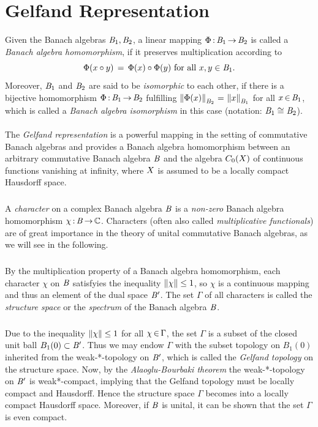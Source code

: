 \documentclass[11pt,twoside]{article}
\begin{document}
\section{Gelfand Representation}
Given the Banach algebras $\mathit{B}_1, \mathit{B}_2$,
a linear mapping $\Phi{\,:\,}\mathit{B}_1 {\,\to\,} \mathit{B}_2$
is called a \textit{Banach algebra homomorphism},
if it preserves multiplication according to 
\[
\Phi(x \circ y) \,=\, \Phi(x) \circ \Phi(y)
\mbox{ for all } x,y \in \mathit{B}_1.
\]
Moreover,
$\mathit{B}_1$ and $\mathit{B}_2$ are said
to be \textit{isomorphic} to each other, 
if there is a bijective homomorphism $\Phi {\,:\,}\mathit{B}_1 {\,\to\,} \mathit{B}_2$ fulfilling
$\left\lVert \Phi(x) \right\rVert_{\mathit{B}_2} {\,=\,} \left\lVert x \right\rVert_{\mathit{B}_1}$ for all $x {\,\in\,} \mathit{B}_1$,
which is called a \textit{Banach algebra isomorphism} in this case
(notation: $\mathit{B}_1 \cong \mathit{B}_2$).

\paragraph{} %
The \textit{Gelfand representation} is a powerful mapping
in the setting of commutative Banach algebras
and provides a Banach algebra homomorphism
between an arbitrary commutative Banach algebra $\mathit{B}$ and
the algebra $C_0(X)$ of continuous functions vanishing at infinity,
where $X$ is assumed to be a locally compact Hausdorff space.

\subparagraph{} %
A \textit{character} on a complex Banach algebra $\mathit{B}$
is a \textit{non-zero} Banach algebra homomorphism $\chi {\,:\,}\mathit{B} {\,\to\,} {\mathbb{C}}$.
Characters (often also called \textit{multiplicative functionals}) are
of great importance in the theory of unital commutative Banach algebras,
as we will see in the following.

\subparagraph{}
By the multiplication property of a Banach algebra homomorphism,
each character $\chi$ on $\mathit{B}$ satisfyies the inequality
$\left\lVert \chi \right\rVert \leq 1$,
so $\chi$ is a continuous mapping and
thus an element of the dual space $\mathit{B}'$.
The set $\Gamma$ of all characters is called the \textit{structure space}
or the \textit{spectrum} of the Banach algebra $\mathit{B}$.

\subparagraph{} %
Due to the inequality $\left\lVert \chi \right\rVert \leq 1$ for all $\chi {\,\in\,} \Gamma$,
the set $\Gamma$ is a subset of the closed unit ball $B_1(0) \subset \mathit{B}'$.
Thus we may endow $\Gamma$ with the subset topology on $B_1(0)$
inherited from the weak-*-topology on $\mathit{B}'$,
which is called the \textit{Gelfand topology} on the structure space.
Now,
by the \textit{Alaoglu-Bourbaki theorem}
the weak-*-topology on $\mathit{B}'$ is weak*-compact,
implying
that the Gelfand topology must be locally compact and Hausdorff.
Hence the structure space $\Gamma$ becomes into
a locally compact Hausdorff space.
Moreover, 
if $\mathit{B}$ is unital,
it can be shown that the set $\Gamma$ is even compact.
\end{document}
